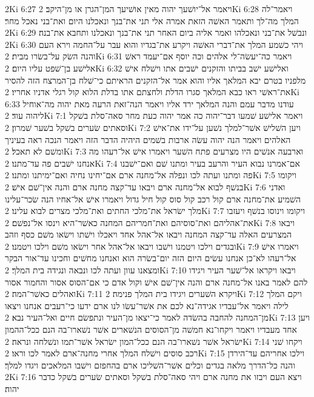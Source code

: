 2Ki 6:27  ויאמר אל־יושׁעך יהוה מאין אושׁיעך המן־הגרן או מן־היקב׃
2Ki 6:28  ויאמר־לה המלך מה־לך ותאמר האשׁה הזאת אמרה אלי תני את־בנך ונאכלנו היום ואת־בני נאכל מחר׃
2Ki 6:29  ונבשׁל את־בני ונאכלהו ואמר אליה ביום האחר תני את־בנך ונאכלנו ותחבא את־בנה׃
2Ki 6:30  ויהי כשׁמע המלך את־דברי האשׁה ויקרע את־בגדיו והוא עבר על־החמה וירא העם והנה השׂק על־בשׂרו מבית׃
2Ki 6:31  ויאמר כה־יעשׂה־לי אלהים וכה יוסף אם־יעמד ראשׁ אלישׁע בן־שׁפט עליו היום׃
2Ki 6:32  ואלישׁע ישׁב בביתו והזקנים ישׁבים אתו וישׁלח אישׁ מלפניו בטרם יבא המלאך אליו והוא אמר אל־הזקנים הראיתם כי־שׁלח בן־המרצח הזה להסיר את־ראשׁי ראו כבא המלאך סגרו הדלת ולחצתם אתו בדלת הלוא קול רגלי אדניו אחריו׃
2Ki 6:33  עודנו מדבר עמם והנה המלאך ירד אליו ויאמר הנה־זאת הרעה מאת יהוה מה־אוחיל ליהוה עוד׃
2Ki 7:1  ויאמר אלישׁע שׁמעו דבר־יהוה כה אמר יהוה כעת מחר סאה־סלת בשׁקל וסאתים שׂערים בשׁקל בשׁער שׁמרון׃
2Ki 7:2  ויען השׁלישׁ אשׁר־למלך נשׁען על־ידו את־אישׁ האלהים ויאמר הנה יהוה עשׂה ארבות בשׁמים היהיה הדבר הזה ויאמר הנכה ראה בעיניך ומשׁם לא תאכל׃
2Ki 7:3  וארבעה אנשׁים היו מצרעים פתח השׁער ויאמרו אישׁ אל־רעהו מה אנחנו ישׁבים פה עד־מתנו׃
2Ki 7:4  אם־אמרנו נבוא העיר והרעב בעיר ומתנו שׁם ואם־ישׁבנו פה ומתנו ועתה לכו ונפלה אל־מחנה ארם אם־יחינו נחיה ואם־ימיתנו ומתנו׃
2Ki 7:5  ויקומו בנשׁף לבוא אל־מחנה ארם ויבאו עד־קצה מחנה ארם והנה אין־שׁם אישׁ׃
2Ki 7:6  ואדני השׁמיע את־מחנה ארם קול רכב קול סוס קול חיל גדול ויאמרו אישׁ אל־אחיו הנה שׂכר־עלינו מלך ישׂראל את־מלכי החתים ואת־מלכי מצרים לבוא עלינו׃
2Ki 7:7  ויקומו וינוסו בנשׁף ויעזבו את־אהליהם ואת־סוסיהם ואת־חמריהם המחנה כאשׁר־היא וינסו אל־נפשׁם׃
2Ki 7:8  ויבאו המצרעים האלה עד־קצה המחנה ויבאו אל־אהל אחד ויאכלו וישׁתו וישׂאו משׁם כסף וזהב ובגדים וילכו ויטמנו וישׁבו ויבאו אל־אהל אחר וישׂאו משׁם וילכו ויטמנו׃
2Ki 7:9  ויאמרו אישׁ אל־רעהו לא־כן אנחנו עשׂים היום הזה יום־בשׂרה הוא ואנחנו מחשׁים וחכינו עד־אור הבקר ומצאנו עוון ועתה לכו ונבאה ונגידה בית המלך׃
2Ki 7:10  ויבאו ויקראו אל־שׁער העיר ויגידו להם לאמר באנו אל־מחנה ארם והנה אין־שׁם אישׁ וקול אדם כי אם־הסוס אסור והחמור אסור ואהלים כאשׁר־המה׃
2Ki 7:11  ויקרא השׁערים ויגידו בית המלך פנימה׃
2Ki 7:12  ויקם המלך לילה ויאמר אל־עבדיו אגידה־נא לכם את אשׁר־עשׂו לנו ארם ידעו כי־רעבים אנחנו ויצאו מן־המחנה להחבה בהשׂדה לאמר כי־יצאו מן־העיר ונתפשׂם חיים ואל־העיר נבא׃
2Ki 7:13  ויען אחד מעבדיו ויאמר ויקחו־נא חמשׁה מן־הסוסים הנשׁארים אשׁר נשׁארו־בה הנם ככל־ההמון ישׂראל אשׁר נשׁארו־בה הנם ככל־המון ישׂראל אשׁר־תמו ונשׁלחה ונראה׃
2Ki 7:14  ויקחו שׁני רכב סוסים וישׁלח המלך אחרי מחנה־ארם לאמר לכו וראו׃
2Ki 7:15  וילכו אחריהם עד־הירדן והנה כל־הדרך מלאה בגדים וכלים אשׁר־השׁליכו ארם בהחפזם וישׁבו המלאכים ויגדו למלך׃
2Ki 7:16  ויצא העם ויבזו את מחנה ארם ויהי סאה־סלת בשׁקל וסאתים שׂערים בשׁקל כדבר יהוה׃
